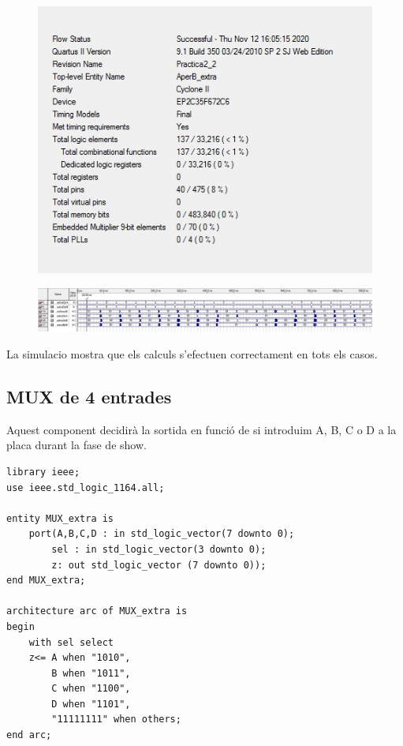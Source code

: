 \documentclass[12pt, a4papre]{article}
\begin{document}
\begin{figure}[H]
		\begin{center}
		\includegraphics[width=130mm]{informeAperBextra.jpeg}
		\end{center}
	\end{figure}
	
	\begin{figure}[H]
		\begin{center}
		\includegraphics[width=130mm]{SimAxBextr.jpeg}
		\end{center}
	\end{figure}
	
	La simulacio mostra que els calculs s'efectuen correctament en tots els casos.
	
	\subsection{MUX de 4 entrades}
	Aquest component decidirà la sortida en funció de si introduim A, B, C o D a la placa durant la fase de show.
	
\begin{lstlisting}[style=vhdl, frame=single, basicstyle=\tiny]
library ieee;
use ieee.std_logic_1164.all;

entity MUX_extra is 
	port(A,B,C,D : in std_logic_vector(7 downto 0);
		sel : in std_logic_vector(3 downto 0);
		z: out std_logic_vector (7 downto 0));
end MUX_extra;

architecture arc of MUX_extra is
begin
	with sel select 
	z<= A when "1010",
		B when "1011",
		C when "1100",
		D when "1101",
		"11111111" when others;
end arc;
\end{lstlisting}
\end{document}
